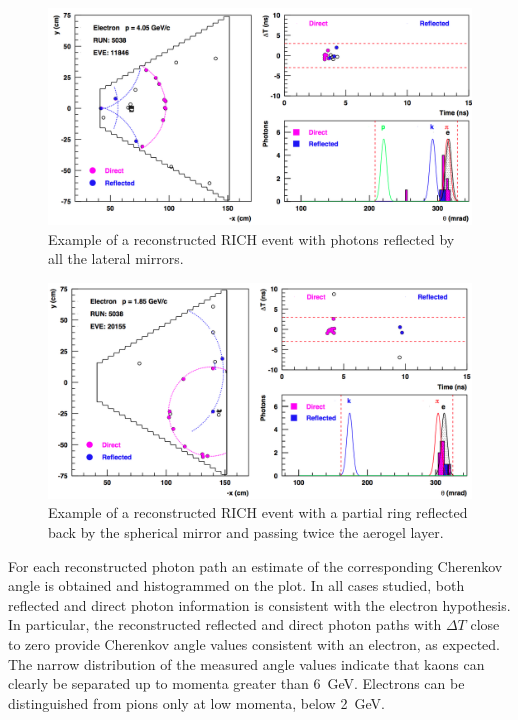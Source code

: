 \documentclass[5p,times,twocolumn]{elsarticle}
\def\dT{$\Delta T$ }
\begin{document}
\begin{figure}[t]
\begin{center}
\includegraphics[width=0.9\columnwidth]{Event_11846.png}
\end{center}
\caption{Example of a reconstructed RICH event with photons reflected by all the lateral mirrors.} 
\label{Fig:Event3}
\end{figure}

\begin{figure}[t]
\begin{center}
\includegraphics[width=0.9\columnwidth]{Event_20155.png}
\end{center}
\caption{Example of a reconstructed RICH event with a partial ring reflected back by the spherical mirror and
  passing twice the aerogel layer.}
\label{Fig:Event4}
\end{figure}

\twocolumn

For each reconstructed photon path an estimate of the corresponding Cherenkov angle is obtained and
histogrammed on the plot. In all cases studied, both reflected and direct photon information is consistent with
the electron hypothesis. In particular, the reconstructed reflected and direct photon paths with \dT close to
zero provide Cherenkov angle values consistent with an electron, as expected. The narrow distribution of the
measured angle values indicate that kaons can clearly be separated up to momenta greater than 6~GeV. Electrons
can be distinguished from pions only at low momenta, below 2~GeV.
\end{document}
